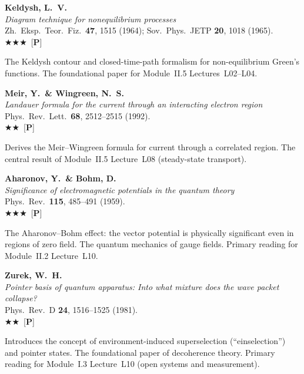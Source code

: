 \documentclass[11pt,a4paper]{article}
\newcommand{\essential}{$\bigstar\bigstar\bigstar$}
\newcommand{\recommended}{$\bigstar\bigstar$}
\newenvironment{bibentry}[1]{\begin{tcolorbox}[entrybox=#1,top=4pt,bottom=4pt]}{\end{tcolorbox}\smallskip}
\begin{document}
\begin{bibentry}{t5light}
\textbf{Keldysh, L.~V.}\\
\textit{Diagram technique for nonequilibrium processes}\\
Zh.~Eksp.~Teor.~Fiz.~\textbf{47}, 1515 (1964); Sov.~Phys.~JETP \textbf{20}, 1018 (1965).\\[3pt]
\essential\ [\textbf{P}]\\[3pt]
\begin{tcolorbox}[annotbox]
The Keldysh contour and closed-time-path formalism for non-equilibrium Green's
functions. The foundational paper for Module~II.5 Lectures~L02--L04.
\end{tcolorbox}
\end{bibentry}

\begin{bibentry}{t5light}
\textbf{Meir, Y.\ \& Wingreen, N.~S.}\\
\textit{Landauer formula for the current through an interacting electron region}\\
Phys.~Rev.~Lett.~\textbf{68}, 2512--2515 (1992).\\[3pt]
\recommended\ [\textbf{P}]\\[3pt]
\begin{tcolorbox}[annotbox]
Derives the Meir--Wingreen formula for current through a correlated region.
The central result of Module~II.5 Lecture~L08 (steady-state transport).
\end{tcolorbox}
\end{bibentry}

\begin{bibentry}{t5light}
\textbf{Aharonov, Y.\ \& Bohm, D.}\\
\textit{Significance of electromagnetic potentials in the quantum theory}\\
Phys.~Rev.~\textbf{115}, 485--491 (1959).\\[3pt]
\essential\ [\textbf{P}]\\[3pt]
\begin{tcolorbox}[annotbox]
The Aharonov--Bohm effect: the vector potential is physically significant even
in regions of zero field. The quantum mechanics of gauge fields. Primary reading
for Module~II.2 Lecture~L10.
\end{tcolorbox}
\end{bibentry}

\begin{bibentry}{t5light}
\textbf{Zurek, W.~H.}\\
\textit{Pointer basis of quantum apparatus: Into what mixture does the wave packet collapse?}\\
Phys.~Rev.~D \textbf{24}, 1516--1525 (1981).\\[3pt]
\recommended\ [\textbf{P}]\\[3pt]
\begin{tcolorbox}[annotbox]
Introduces the concept of environment-induced superselection (``einselection'') and
pointer states. The foundational paper of decoherence theory. Primary reading for
Module~I.3 Lecture~L10 (open systems and measurement).
\end{tcolorbox}
\end{bibentry}
\end{document}
